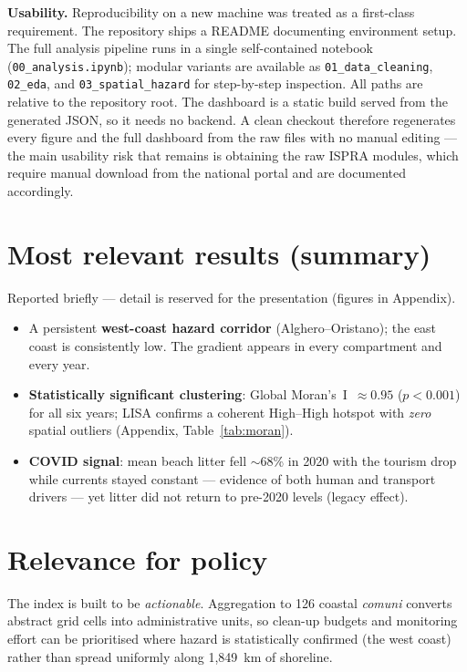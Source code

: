 \documentclass[11pt,a4paper]{article}
\begin{document}
\textbf{Usability.} Reproducibility on a new machine was treated as a first-class requirement. The
repository ships a README documenting environment setup. The full analysis pipeline runs in a single
self-contained notebook (\texttt{00\_analysis.ipynb}); modular variants are available as
\texttt{01\_data\_cleaning}, \texttt{02\_eda}, and \texttt{03\_spatial\_hazard} for step-by-step
inspection. All paths are relative to the repository root. The dashboard is a static build served
from the generated JSON, so it needs no backend. A clean checkout therefore regenerates every figure
and the full dashboard from the raw files with no manual editing --- the main usability risk that
remains is obtaining the raw ISPRA modules, which require manual download from the national portal
and are documented accordingly.

\section{Most relevant results (summary)}
Reported briefly --- detail is reserved for the presentation (figures in Appendix).
\begin{itemize}
\item A persistent \textbf{west-coast hazard corridor} (Alghero--Oristano); the east coast is
consistently low. The gradient appears in every compartment and every year.
\item \textbf{Statistically significant clustering}: Global Moran's~I~$\approx 0.95$
($p<0.001$) for all six years; LISA confirms a coherent High--High hotspot with \emph{zero} spatial
outliers (Appendix, Table~\ref{tab:moran}).
\item \textbf{COVID signal}: mean beach litter fell $\sim$68\% in 2020 with the tourism drop while
currents stayed constant --- evidence of both human and transport drivers --- yet litter did not
return to pre-2020 levels (legacy effect).
\end{itemize}

\section{Relevance for policy}
The index is built to be \emph{actionable}. Aggregation to 126 coastal \textit{comuni} converts
abstract grid cells into administrative units, so clean-up budgets and monitoring effort can be
prioritised where hazard is statistically confirmed (the west coast) rather than spread uniformly
along 1{,}849~km of shoreline.
\end{document}

